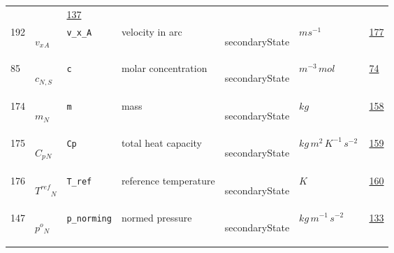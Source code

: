 \begin{longtable}{|p{1cm}|p{2.5cm}|p{4.5cm}|p{8cm}|p{3.0cm}|p{3cm}|p{1cm}|}
             & $  $
             &                 \hyperlink{"e:137"}{ 137 }
                 \\
            192
             & \hypertarget{"v:192"}{ $ {{v_x}}{_{A}} $}
             & \verb|v_x_A|
             & velocity in arc
             & \begin{lay}secondaryState \end{lay}
             & $ m s^{-1} \, $
             &                 \hyperlink{"e:177"}{ 177 }
                 \\
            85
             & \hypertarget{"v:85"}{ $ {c}{_{N, S}} $}
             & \verb|c|
             & molar concentration
             & \begin{lay}secondaryState \end{lay}
             & $ m^{-3} \,mol \, $
             &                 \hyperlink{"e:74"}{ 74 }
                 \\
            174
             & \hypertarget{"v:174"}{ $ {m}{_{N}} $}
             & \verb|m|
             & mass
             & \begin{lay}secondaryState \end{lay}
             & $ kg \, $
             &                 \hyperlink{"e:158"}{ 158 }
                 \\
            175
             & \hypertarget{"v:175"}{ $ {{C_p}}{_{N}} $}
             & \verb|Cp|
             & total heat capacity
             & \begin{lay}secondaryState \end{lay}
             & $ kg \,m^{2} \,K^{-1} \,s^{-2} \, $
             &                 \hyperlink{"e:159"}{ 159 }
                 \\
            176
             & \hypertarget{"v:176"}{ $ {{T^{ref}}}{_{N}} $}
             & \verb|T_ref|
             & reference temperature
             & \begin{lay}secondaryState \end{lay}
             & $ K \, $
             &                 \hyperlink{"e:160"}{ 160 }
                 \\
            147
             & \hypertarget{"v:147"}{ $ {{p^o}}{_{N}} $}
             & \verb|p_norming|
             & normed pressure
             & \begin{lay}secondaryState \end{lay}
             & $ kg \,m^{-1} \,s^{-2} \, $
             &                 \hyperlink{"e:133"}{ 133 }
                 \\

\end{longtable}
